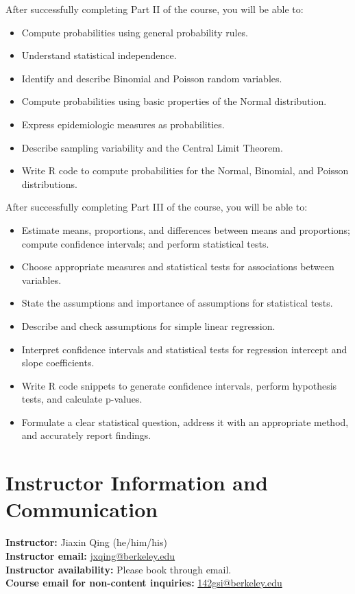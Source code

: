\documentclass[11pt]{article}
\begin{document}
After successfully completing Part II of the course, you will be able to:
\begin{itemize}
  \item Compute probabilities using general probability rules.
  \item Understand statistical independence.
  \item Identify and describe Binomial and Poisson random variables.
  \item Compute probabilities using basic properties of the Normal distribution.
  \item Express epidemiologic measures as probabilities.
  \item Describe sampling variability and the Central Limit Theorem.
  \item Write R code to compute probabilities for the Normal, Binomial, and Poisson distributions.
\end{itemize}

After successfully completing Part III of the course, you will be able to:
\begin{itemize}
  \item Estimate means, proportions, and differences between means and proportions; compute confidence intervals; and perform statistical tests.
  \item Choose appropriate measures and statistical tests for associations between variables.
  \item State the assumptions and importance of assumptions for statistical tests.
  \item Describe and check assumptions for simple linear regression.
  \item Interpret confidence intervals and statistical tests for regression intercept and slope coefficients.
  \item Write R code snippets to generate confidence intervals, perform hypothesis tests, and calculate p-values.
  \item Formulate a clear statistical question, address it with an appropriate method, and accurately report findings.
\end{itemize}

\section*{Instructor Information and Communication}

\textbf{Instructor:} Jiaxin Qing (he/him/his)\\
\textbf{Instructor email:} \href{mailto:jxqing@berkeley.edu}{jxqing@berkeley.edu}\\
\textbf{Instructor availability:} Please book through email.\\
\textbf{Course email for non-content inquiries:} \href{mailto:142gsi@berkeley.edu}{142gsi@berkeley.edu}
\end{document}
